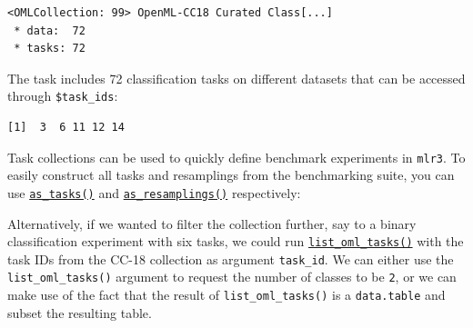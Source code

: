 \begin{Shaded}
\begin{Highlighting}[]
\end{Highlighting}
\end{Shaded}

\begin{verbatim}
<OMLCollection: 99> OpenML-CC18 Curated Class[...]
 * data:  72
 * tasks: 72
\end{verbatim}

The task includes 72 classification tasks on different datasets that can
be accessed through \texttt{\$task\_ids}:

\begin{Shaded}
\begin{Highlighting}[]
\SpecialCharTok{$}\NormalTok{task\_ids[}\SpecialCharTok{:}\NormalTok{] }
\end{Highlighting}
\end{Shaded}

\begin{verbatim}
[1]  3  6 11 12 14
\end{verbatim}

Task collections can be used to quickly define benchmark experiments in
\texttt{mlr3}. To easily construct all tasks and resamplings from the
benchmarking suite, you can use
\href{https://mlr3.mlr-org.com/reference/as_task.html}{\texttt{as\_tasks()}}
and
\href{https://mlr3.mlr-org.com/reference/as_resampling.html}{\texttt{as\_resamplings()}}
respectively:

\begin{Shaded}
\begin{Highlighting}[]
\OtherTok{=} 
\OtherTok{=} 
\end{Highlighting}
\end{Shaded}

Alternatively, if we wanted to filter the collection further, say to a
binary classification experiment with six tasks, we could run
\href{https://mlr3oml.mlr-org.com/reference/list_oml.html}{\texttt{list\_oml\_tasks()}}
with the task IDs from the CC-18 collection as argument
\texttt{task\_id}. We can either use the \texttt{list\_oml\_tasks()}
argument to request the number of classes to be \texttt{2}, or we can
make use of the fact that the result of \texttt{list\_oml\_tasks()} is a
\texttt{data.table} and subset the resulting table.

